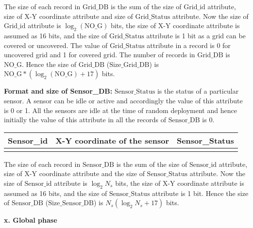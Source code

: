 \documentclass{article}
\begin{document}
The size of each record in $\text{Grid\_DB}$ is the sum of the size of $\text{Grid\_id}$ attribute, size of X-Y coordinate attribute and size of $\text{Grid\_Status}$ attribute. Now the size of $\text{Grid\_id}$ attribute is $\log_2(\text{NO\_G})$ bits, the size of X-Y coordinate attribute is assumed as 16 bits, and the size of $\text{Grid\_Status}$ attribute is 1 bit as a grid can be covered or uncovered. The value of $\text{Grid\_Status}$ attribute in a record is 0 for uncovered grid and 1 for covered grid. The number of records in $\text{Grid\_DB}$ is $\text{NO\_G}$. Hence the size of $\text{Grid\_DB}$ ($\text{Size\_Grid\_DB}$) is $\text{NO\_G} * (\log_2(\text{NO\_G}) + 17)$ bits.

\noindent\textbf{Format and size of Sensor\_DB:} $\text{Sensor\_Status}$ is the status of a particular sensor. A sensor can be idle or active and accordingly the value of this attribute is 0 or 1. All the sensors are idle at the time of random deployment and hence initially the value of this attribute in all the records of $\text{Sensor\_DB}$ is 0.

\begin{center}
\begin{tabular}{|l|l|l|}
\hline
Sensor\_id & X-Y coordinate of the sensor & Sensor\_Status \\
\hline
 & & \\ %
\hline
\end{tabular}
\end{center}

The size of each record in $\text{Sensor\_DB}$ is the sum of the size of $\text{Sensor\_id}$ attribute, size of X-Y coordinate attribute and the size of $\text{Sensor\_Status}$ attribute. Now the size of $\text{Sensor\_id}$ attribute is $\log_2 N_s$ bits, the size of X-Y coordinate attribute is assumed as 16 bits, and the size of $\text{Sensor\_Status}$ attribute is 1 bit. Hence the size of $\text{Sensor\_DB}$ ($\text{Size\_Sensor\_DB}$) is $N_s(\log_2 N_s + 17)$ bits.

\noindent\textbf{x. Global phase}
\end{document}
